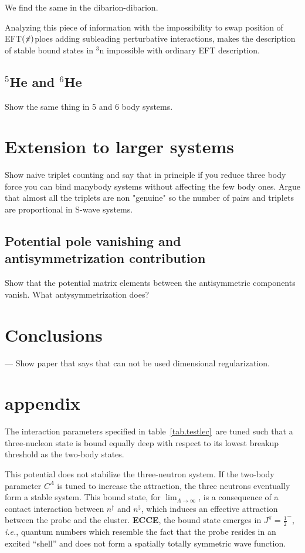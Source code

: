 \documentclass[onecolumn,preprint,nosuperscriptaddress,nofootinbib,12pt,linenumbers]{revtex4-1}
\newcommand{\ie}{\textit{i.e.}\;}
\newcommand{\eftnopi}{\mbox{EFT$(\not \! \pi)$}}
\begin{document}
We find the same in the dibarion-dibarion.

Analyzing this piece of information with the impossibility to swap position of \eftnopi ploes adding subleading perturbative interactions, makes the description of stable bound states in $^3$n impossible with ordinary EFT description.










\subsection{$^5$He and $^6$He}
Show the same thing in 5 and 6 body systems.



\section{Extension to larger systems}
Show naive triplet counting and say that in principle if you reduce three body force you can bind manybody systems without affecting the few body ones.
Argue that almost all the triplets are non "genuine" so the number of pairs and triplets are proportional in S-wave systems.

\subsection{Potential pole vanishing and antisymmetrization contribution}
Show that the potential matrix elements between the antisymmetric components vanish.
What antysymmetrization does?

\section{Conclusions}
---
Show paper that says that can not be used dimensional regularization.

\newpage

\section*{appendix}

The interaction parameters specified in table~\ref{tab.testlec}~are tuned such that a
three-nucleon state is bound equally deep with respect to its lowest breakup threshold as
the two-body states.

This potential does not stabilize the three-neutron system. If the two-body parameter $C^\Lambda$
is tuned to increase the attraction, the three neutrons eventually form a stable system. This
bound state, for $\lim_{\Lambda\to\infty}$, is a consequence of a contact interaction
between $n^\upharpoonright$ and $n^\downharpoonright$, which induces an effective attraction
between the probe and the cluster. {\bf ECCE}, the bound state emerges in $J^\pi=\frac{1}{2}^-$, \ie,
quantum numbers which resemble the fact that the probe resides in an excited ``shell'' and does
not form a spatially totally symmetric wave function.
\end{document}
